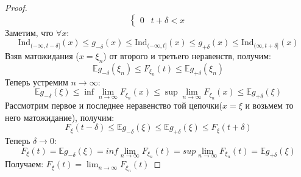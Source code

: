 \begin{proof}
\[\begin{cases}
        0 & t + \delta < x
    \end{cases}
\]
Заметим, что $\forall x$: $$
\text{Ind}_{(- \infty, t - \delta]}\left(x\right) \leq g_{-\delta}\left(x\right) \leq \text{Ind}_{(-\infty, t]}\left(x\right) \leq g_{+\delta}\left(x\right) \leq \text{Ind}_{(\infty, t + \delta]}\left(x\right)$$
Взяв матожидания ($x = \xi_{n}$) от второго и третьего неравенств, получим: $$ \mathbb{E}  g_{-\delta}\left(\xi_{n}\right) \leq F_{\xi_{n}}\left(t\right) \leq  \mathbb{E}  g_{+ \delta}\left(\xi_{n}\right)$$
Теперь устремим $n \to \infty$: 
\[
     \mathbb{E}  g_{-\delta}\left(\xi\right) \leq \inf \lim_{n \to \infty} F_{\xi_{n}}\left(x\right) \leq \sup \lim_{n \to \infty} F_{\xi_{n}}\left(x\right) \leq  \mathbb{E}  g_{+ \delta}\left(\xi \right)
\]
Рассмотрим первое и последнее неравенство той цепочки($x = \xi$ и возьмем то него матожидание), получим: 
\[
    F_{\xi}\left(t - \delta\right) \leq  \mathbb{E}  g_{- \delta}\left(\xi\right) \leq  \mathbb{E}  g_{+ \delta}\left(\xi\right) \leq F_{\xi}\left(t + \delta\right)
\]
Теперь $\delta \to 0$: 
\[
    F_{\xi}\left(t\right) =  \mathbb{E}  g_{- \delta}\left(\xi\right) = inf \lim_{n \to \infty} F_{\xi_{n}}\left(t\right) = sup \lim_{n \to \infty} F_{\xi_{n}}\left(t\right) =  \mathbb{E}  g_{+ \delta}\left(\xi\right)
\]
Получаем: $F_{\xi}\left(t\right) = \lim_{n \to \infty} F_{\xi_{n}}\left(t\right)$

\end{proof}

